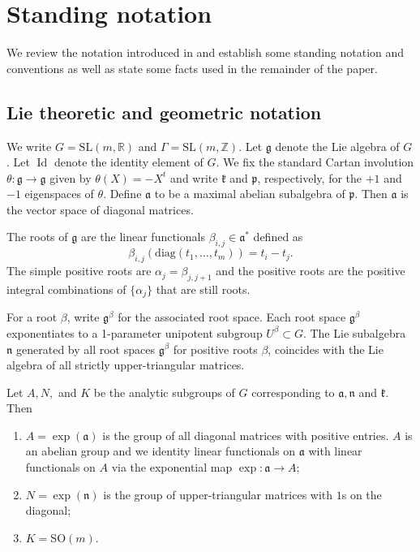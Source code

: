 \documentclass[10pt,reqno]{amsart}
\theoremstyle{Theorem}
\theoremstyle{definition}
\theoremstyle{remark}
\newcommand{\note}[1]{\marginpar{{\color{red}\footnotesize \begin{spacing}{1}#1\end{spacing}}}}
\def \diag{\mathrm{diag}}
\DeclareMathOperator{\Id}{Id}
\newcommand{\R}{\mathbb {R}}
\newcommand{\Z}{\mathbb {Z}}
\newcommand{\Sl}{\mathrm{SL}}
\newcommand{\So}{\mathrm{SO}}
\newcommand{\lieg}{\mathfrak g}
\newcommand{\liek}{\mathfrak k}
\newcommand{\lien}{\mathfrak n}
\newcommand{\liea}{\mathfrak a}
\newcommand{\liep}{\mathfrak p}
\begin{document}
\section{Standing notation} %
We review the notation introduced in \cite{BFH} and establish some standing notation and conventions as well as state some facts  used in the remainder of the paper.

\subsection{Lie theoretic and geometric notation}
We write $G= \Sl(m,\R)$ and $\Gamma= \Sl(m,\Z)$.  Let $\lieg$ denote the Lie algebra of $G$.  Let $\Id$ denote the identity element of  $G$.
We fix the standard Cartan involution $\theta \colon \lieg\to \lieg$ given by $\theta (X) = -X^{t}$ and write $\liek$ and $\liep$, respectively,  for the $+1$ and $-1$ eigenspaces of $\theta$.   Define $\liea$  to be a maximal abelian subalgebra of $\liep$.  Then $\liea$ is the vector space of diagonal matrices.


The roots of $\lieg$ are the  linear functionals $\beta_{i,j}\in \liea^*$ defined as $$\beta_{i,j}(\diag (t_1, \dots, t_m)) = t_i-t_j.$$  The simple positive roots are $\alpha_{j} = \beta_{j,j+1}$ and the positive roots are the positive integral combinations of $\{\alpha_j\}$ that are still roots.

For a root $\beta$, write $\lieg^\beta$ for the associated root space.   Each root space $\lieg^\beta$ exponentiates to a 1-parameter unipotent subgroup $U^\beta\subset G$.
The Lie subalgebra $\lien$ generated by all root spaces $\lieg^\beta$ for positive roots $\beta$, coincides with the Lie algebra of all strictly upper-triangular matrices.

Let $A,N,$ and $ K$ be the {analytic subgroups} of $G$ corresponding to $\liea, \lien$ and $\liek$.  Then
\begin{enumerate}
\item $A= \exp (\liea)$ is the group of all diagonal matrices with positive entries.  $A$ is an abelian group and we identity linear functionals on $\liea$ with linear functionals on $A$ via the exponential map $\exp\colon \liea\to A$;
\item $N= \exp (\lien)$ is the group of upper-triangular matrices with $1$s on the diagonal;
\item $K = \So(m)$.
\end{enumerate}
\end{document}
